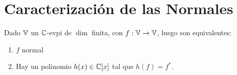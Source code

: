 \documentclass{article}
\begin{document}
\section*{Caracterización de las Normales}
\begin{teo}
    Dado $\mathbb{V}$ un $\mathbb{C}$-evpi de $\dim$ finita, con $f: \mathbb{V} \to \mathbb{V}$, luego son equivalentes:
    \begin{enumerate}
        \item $f$ normal
        \item Hay un polinomio $h(x) \in \mathbb{C}[x]$ tal que $h(f) = f^*$.
    \end{enumerate}
\end{teo}
\end{document}
